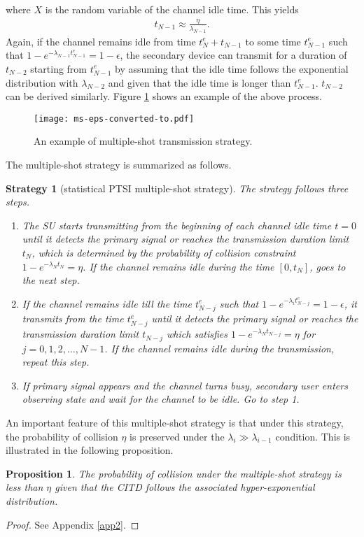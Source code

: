 \documentclass[10pt,final,journal,letterpaper]{IEEEtran}
\newtheorem{proposition}{Proposition}
\newtheorem{strategy}{Strategy}
\begin{document}
where $X$ is the random variable of the channel idle time. This yields
\begin{align}
    t_{N-1}\approx\frac{\eta}{\lambda_{N-1}}.\nonumber
\end{align}
Again, if the channel remains idle from time $t_N^e+t_{N-1}$ to some time $t_{N-1}^e$ such that $1-e^{-\lambda_{N-1}t_{N-1}^e}=1-\epsilon$, the secondary device can transmit for a duration of $t_{N-2}$ starting from $t_{N-1}^e$ by assuming that the idle time follows the exponential distribution with $\lambda_{N-2}$ and given that the idle time is longer than $t_{N-1}^e$. $t_{N-2}$ can be derived similarly. Figure \ref{fig:ms} shows an example of the above process.
\begin{figure}[!t]
\centering
\texttt{[image: ms-eps-converted-to.pdf]}
\caption{An example of multiple-shot transmission strategy.}
\label{fig:ms}
\end{figure}

\par
The multiple-shot strategy is summarized as follows.
\begin{strategy}[statistical PTSI multiple-shot strategy]
The strategy follows three steps.
\begin{enumerate}
  \item The SU starts transmitting from the beginning of each channel idle time $t=0$ until it detects the primary signal or reaches the transmission duration limit $t_N$, which is determined by the probability of collision constraint $1-e^{-\lambda_Nt_N}=\eta$. If the channel remains idle during the time $[0, t_N]$, goes to the next step.
  \item If the channel remains idle till the time $t_{N-j}^e$ such that $1-e^{-\lambda_{i}t_{N-j}^e}= 1-\epsilon$, it transmits from the time $t_{N-j}^e$ until it detects the primary signal or reaches the transmission duration limit  $t_{N-j}$ which satisfies $1-e^{-\lambda_Nt_{N-j}}=\eta$ for $j=0, 1, 2, \ldots, N-1$. If the channel remains idle during the transmission, repeat this step.
  \item If primary signal appears and the channel turns busy, secondary user enters observing state and wait for the channel to be idle. Go to step 1.
\end{enumerate}
\end{strategy}

\par
An important feature of this multiple-shot strategy is that under this strategy, the probability of collision $\eta$ is preserved under the $\lambda_i\gg \lambda_{i-1}$ condition. This is illustrated in the following proposition.
\begin{proposition}\label{sec4prop1}
The probability of collision under the multiple-shot strategy is less than $\eta$ given that the CITD follows the associated hyper-exponential distribution.
\end{proposition}
\begin{proof}
See Appendix \ref{app2}.
\end{proof}
\end{document}
